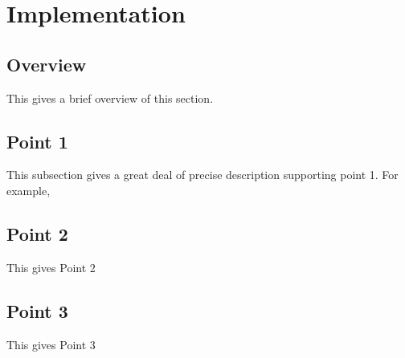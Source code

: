 \section{Implementation}																	
\label{sec:Implementation}

\subsection{Overview} 
This gives a brief overview of this section.

\subsection{Point 1}
This subsection gives a great deal of precise description supporting point 1.  For example,

\subsection{Point 2}
This gives Point 2

\subsection{Point 3}
This gives Point 3
